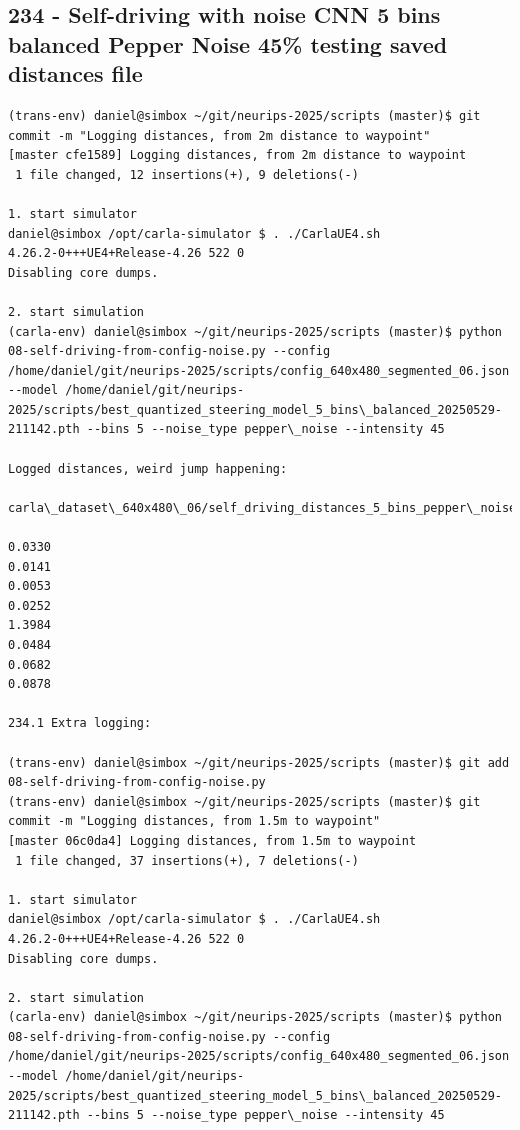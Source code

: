 \subsection{234 - Self-driving with noise CNN 5 bins balanced Pepper Noise 45\% testing saved distances file}
\label{app_res:234}

\begin{verbatim}
(trans-env) daniel@simbox ~/git/neurips-2025/scripts (master)$ git commit -m "Logging distances, from 2m distance to waypoint"
[master cfe1589] Logging distances, from 2m distance to waypoint
 1 file changed, 12 insertions(+), 9 deletions(-)

1. start simulator
daniel@simbox /opt/carla-simulator $ . ./CarlaUE4.sh 
4.26.2-0+++UE4+Release-4.26 522 0
Disabling core dumps.

2. start simulation
(carla-env) daniel@simbox ~/git/neurips-2025/scripts (master)$ python 08-self-driving-from-config-noise.py --config /home/daniel/git/neurips-2025/scripts/config_640x480_segmented_06.json --model /home/daniel/git/neurips-2025/scripts/best_quantized_steering_model_5_bins\_balanced_20250529-211142.pth --bins 5 --noise_type pepper\_noise --intensity 45

Logged distances, weird jump happening:

carla\_dataset\_640x480\_06/self_driving_distances_5_bins_pepper\_noise_45_20250609_124014.txt

0.0330
0.0141
0.0053
0.0252
1.3984
0.0484
0.0682
0.0878

234.1 Extra logging:

(trans-env) daniel@simbox ~/git/neurips-2025/scripts (master)$ git add 08-self-driving-from-config-noise.py 
(trans-env) daniel@simbox ~/git/neurips-2025/scripts (master)$ git commit -m "Logging distances, from 1.5m to waypoint"
[master 06c0da4] Logging distances, from 1.5m to waypoint
 1 file changed, 37 insertions(+), 7 deletions(-)

1. start simulator
daniel@simbox /opt/carla-simulator $ . ./CarlaUE4.sh 
4.26.2-0+++UE4+Release-4.26 522 0
Disabling core dumps.

2. start simulation
(carla-env) daniel@simbox ~/git/neurips-2025/scripts (master)$ python 08-self-driving-from-config-noise.py --config /home/daniel/git/neurips-2025/scripts/config_640x480_segmented_06.json --model /home/daniel/git/neurips-2025/scripts/best_quantized_steering_model_5_bins\_balanced_20250529-211142.pth --bins 5 --noise_type pepper\_noise --intensity 45



\end{verbatim}
